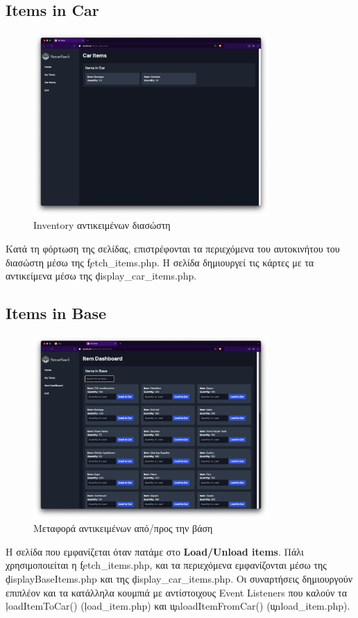     \subsection{Items in Car}
        \begin{figure}[H] \noindent \centering
            \includegraphics[width=0.8\textwidth]{img/rescuer-car_items}
            \caption{Inventory αντικειμένων διασώστη}
        \end{figure}

        Κατά τη φόρτωση της σελίδας, επιστρέφονται τα περιεχόμενα του αυτοκινήτου του διασώστη μέσω της \c{fetch\_items.php}.
        Η σελίδα δημιουργεί τις κάρτες με τα αντικείμενα μέσω της \c{display\_car\_items.php}.

    \subsection{Items in Base}
        \begin{figure}[H] \noindent \centering
            \includegraphics[width=0.8\textwidth]{img/rescuer-items_in_base}
            \caption{Μεταφορά αντικειμένων από/προς την βάση}
        \end{figure}

        Η σελίδα που εμφανίζεται όταν πατάμε στο \textbf{Load/Unload items}.
        Πάλι χρησιμοποιείται η \c{fetch\_items.php}, και τα περιεχόμενα εμφανίζονται μέσω της \c{displayBaseItems.php} και της \c{display\_car\_items.php}.
        Οι συναρτήσεις δημιουργούν επιπλέον και τα κατάλληλα κουμπιά με αντίστοιχους Event Listeners που καλούν τα \c{loadItemToCar()} (\c{load\_item.php}) και \c{unloadItemFromCar()} (\c{unload\_item.php}).